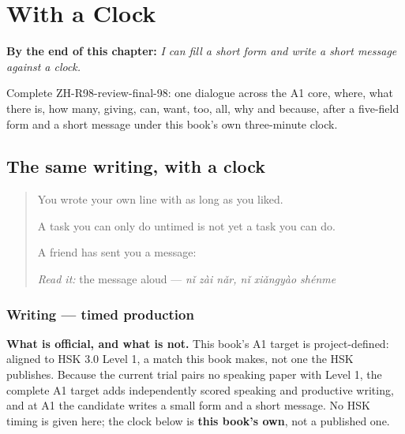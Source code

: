 
\chapter{With a Clock}
\label{ch:zh-with-a-clock}

\begin{chapteropening}
\textbf{By the end of this chapter:} \emph{I can fill a short form and write a short message against a clock.}

Complete ZH-R98-review-final-98: one dialogue across the A1 core, where, what there is, how many, giving, can, want, too, all, why and because, after a five-field form and a short message under this book's own three-minute clock.
\end{chapteropening}

\section[Practice]{The same writing, with a clock}

\label{lesson:ZH-W98-with-a-clock}



\begin{quote}
You wrote your own line with as long as you liked.

A task you can only do untimed is not yet a task you can do.

A friend has sent you a message:

\begin{quote}
 
\end{quote}

\emph{Read it:} the message aloud — \emph{nǐ zài nǎr, nǐ xiǎngyào shénme}
\end{quote}

\subsection*{Writing — timed production}
\textbf{What is official, and what is not.} This book's A1 target is project-defined: aligned to HSK 3.0 Level 1, a match this book makes, not one the HSK publishes. Because the current trial pairs no speaking paper with Level 1, the complete A1 target adds independently scored speaking and productive writing, and at A1 the candidate writes a small form and a short message. No HSK timing is given here; the clock below is \textbf{this book's own}, not a published one.

